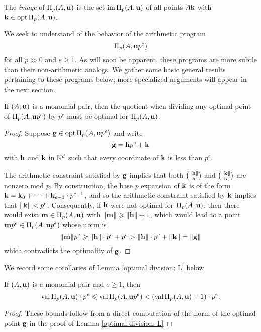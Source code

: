 \documentclass[11pt]{amsart}
\renewcommand{\!}[1]{{\color{red}\text{$\star$\,}#1\,$\star$}}
\begin{document}
\begin{definition}
The \emph{image} of $\Pi_p(A, \mathbf{u})$ is the set $\operatorname{im} \Pi_p(A, \mathbf{u})$ of all points  $A \mathbf{k}$ with $\mathbf{k} \in \operatorname{opt} \Pi_p(A, \mathbf{u})$. 
\end{definition}

We seek to understand of the behavior of the arithmetic program \[ \Pi_p(A, \mathbf{u}p^e)\] for all $p \gg 0$ and $e \geq 1$.    As will soon be apparent, these programs are more subtle than their non-arithmetic analogs.  We gather some basic general results pertaining to these programs below;  more specialized arguments will appear in the next section.

\begin{lemma} 
\label{optimal division: L}  If $(A, \mathbf{u})$ is a monomial pair, then the quotient when dividing any optimal point of $\Pi_p(A, \mathbf{u}p^e)$ by $p^e$ must be optimal for $\Pi_p(A, \mathbf{u})$.
\end{lemma}

\begin{proof}  Suppose $\mathbf{g} \in \operatorname{opt} \Pi_p(A, \mathbf{u}p^e)$ and write 
\[ \mathbf{g} = \mathbf{h} p^e + \mathbf{k} \]
with $\mathbf{h}$ and $\mathbf{k}$ in $\mathbb{N}^d$ such that every coordinate of $\mathbf{k}$ is less than $p^e$.

The arithmetic constraint satisfied by $\mathbf{g}$ implies that both $\binom{\| \mathbf{h} \|}{\mathbf{h}}$ and $\binom{\| \mathbf{k} \|}{\mathbf{k}}$ are nonzero mod $p$.  By construction,  the base $p$ expansion of $\mathbf{k}$ is of the form $\mathbf{k} = \mathbf{k}_0 + \cdots + \mathbf{k}_{e-1} \cdot p^{e-1}$, and so the arithmetic constraint satisfied by $\mathbf{k}$ implies that $\| \mathbf{k} \| < p^e$.   Consequently, if $\mathbf{h}$ were not optimal for $\Pi_p(A, \mathbf{u})$, then there would exist $\mathbf{m} \in \Pi_p(A, \mathbf{u})$ with $\| \mathbf{m} \| \geqslant \| \mathbf{h} \| + 1$, which would lead to a point $\mathbf{m}p^e \in \Pi_p(A, \mathbf{u}p^e)$ whose norm is \[ \| \mathbf{m} \|p^e \geqslant \| \mathbf{h} \| \cdot p^e + p^e >  \| \mathbf{h} \| \cdot p^e + \| \mathbf{k} \| = \| \mathbf{g} \|\] which contradicts the optimality of $\mathbf{g}$. %
\end{proof}

We record some corollaries of Lemma \ref{optimal division: L} below.

\begin{corollary} 
\label{natural bounds: C}
If $(A, \mathbf{u})$ is a monomial pair and $e \geq 1$, then 
\[ \operatorname{val} \Pi_p(A, \mathbf{u}) \cdot p^e \leqslant \operatorname{val} \Pi_p(A, \mathbf{u}p^e) < (\operatorname{val} \Pi_p(A, \mathbf{u}) +1) \cdot p^e. \]
\end{corollary}
\begin{proof}
These bounds follow from a direct computation of the norm of the optimal point $\mathbf{g}$ in the proof of Lemma \ref{optimal division: L}
\end{proof}
\end{document}
